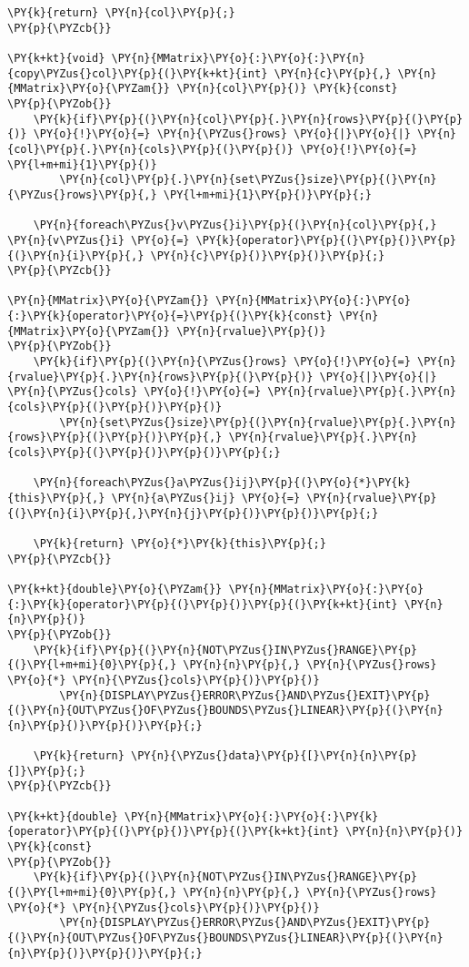 \begin{Verbatim}[commandchars=\\\{\}]
	\PY{k}{return} \PY{n}{col}\PY{p}{;}
\PY{p}{\PYZcb{}}

\PY{k+kt}{void} \PY{n}{MMatrix}\PY{o}{:}\PY{o}{:}\PY{n}{copy\PYZus{}col}\PY{p}{(}\PY{k+kt}{int} \PY{n}{c}\PY{p}{,} \PY{n}{MMatrix}\PY{o}{\PYZam{}} \PY{n}{col}\PY{p}{)} \PY{k}{const}
\PY{p}{\PYZob{}}
	\PY{k}{if}\PY{p}{(}\PY{n}{col}\PY{p}{.}\PY{n}{rows}\PY{p}{(}\PY{p}{)} \PY{o}{!}\PY{o}{=} \PY{n}{\PYZus{}rows} \PY{o}{|}\PY{o}{|} \PY{n}{col}\PY{p}{.}\PY{n}{cols}\PY{p}{(}\PY{p}{)} \PY{o}{!}\PY{o}{=} \PY{l+m+mi}{1}\PY{p}{)}
		\PY{n}{col}\PY{p}{.}\PY{n}{set\PYZus{}size}\PY{p}{(}\PY{n}{\PYZus{}rows}\PY{p}{,} \PY{l+m+mi}{1}\PY{p}{)}\PY{p}{;}

	\PY{n}{foreach\PYZus{}v\PYZus{}i}\PY{p}{(}\PY{n}{col}\PY{p}{,} \PY{n}{v\PYZus{}i} \PY{o}{=} \PY{k}{operator}\PY{p}{(}\PY{p}{)}\PY{p}{(}\PY{n}{i}\PY{p}{,} \PY{n}{c}\PY{p}{)}\PY{p}{)}\PY{p}{;}
\PY{p}{\PYZcb{}}

\PY{n}{MMatrix}\PY{o}{\PYZam{}} \PY{n}{MMatrix}\PY{o}{:}\PY{o}{:}\PY{k}{operator}\PY{o}{=}\PY{p}{(}\PY{k}{const} \PY{n}{MMatrix}\PY{o}{\PYZam{}} \PY{n}{rvalue}\PY{p}{)}
\PY{p}{\PYZob{}}
	\PY{k}{if}\PY{p}{(}\PY{n}{\PYZus{}rows} \PY{o}{!}\PY{o}{=} \PY{n}{rvalue}\PY{p}{.}\PY{n}{rows}\PY{p}{(}\PY{p}{)} \PY{o}{|}\PY{o}{|} \PY{n}{\PYZus{}cols} \PY{o}{!}\PY{o}{=} \PY{n}{rvalue}\PY{p}{.}\PY{n}{cols}\PY{p}{(}\PY{p}{)}\PY{p}{)}
		\PY{n}{set\PYZus{}size}\PY{p}{(}\PY{n}{rvalue}\PY{p}{.}\PY{n}{rows}\PY{p}{(}\PY{p}{)}\PY{p}{,} \PY{n}{rvalue}\PY{p}{.}\PY{n}{cols}\PY{p}{(}\PY{p}{)}\PY{p}{)}\PY{p}{;}

	\PY{n}{foreach\PYZus{}a\PYZus{}ij}\PY{p}{(}\PY{o}{*}\PY{k}{this}\PY{p}{,} \PY{n}{a\PYZus{}ij} \PY{o}{=} \PY{n}{rvalue}\PY{p}{(}\PY{n}{i}\PY{p}{,}\PY{n}{j}\PY{p}{)}\PY{p}{)}\PY{p}{;}

	\PY{k}{return} \PY{o}{*}\PY{k}{this}\PY{p}{;}
\PY{p}{\PYZcb{}}

\PY{k+kt}{double}\PY{o}{\PYZam{}} \PY{n}{MMatrix}\PY{o}{:}\PY{o}{:}\PY{k}{operator}\PY{p}{(}\PY{p}{)}\PY{p}{(}\PY{k+kt}{int} \PY{n}{n}\PY{p}{)}
\PY{p}{\PYZob{}}
	\PY{k}{if}\PY{p}{(}\PY{n}{NOT\PYZus{}IN\PYZus{}RANGE}\PY{p}{(}\PY{l+m+mi}{0}\PY{p}{,} \PY{n}{n}\PY{p}{,} \PY{n}{\PYZus{}rows} \PY{o}{*} \PY{n}{\PYZus{}cols}\PY{p}{)}\PY{p}{)}
		\PY{n}{DISPLAY\PYZus{}ERROR\PYZus{}AND\PYZus{}EXIT}\PY{p}{(}\PY{n}{OUT\PYZus{}OF\PYZus{}BOUNDS\PYZus{}LINEAR}\PY{p}{(}\PY{n}{n}\PY{p}{)}\PY{p}{)}\PY{p}{;}

	\PY{k}{return} \PY{n}{\PYZus{}data}\PY{p}{[}\PY{n}{n}\PY{p}{]}\PY{p}{;}
\PY{p}{\PYZcb{}}

\PY{k+kt}{double} \PY{n}{MMatrix}\PY{o}{:}\PY{o}{:}\PY{k}{operator}\PY{p}{(}\PY{p}{)}\PY{p}{(}\PY{k+kt}{int} \PY{n}{n}\PY{p}{)} \PY{k}{const}
\PY{p}{\PYZob{}}
	\PY{k}{if}\PY{p}{(}\PY{n}{NOT\PYZus{}IN\PYZus{}RANGE}\PY{p}{(}\PY{l+m+mi}{0}\PY{p}{,} \PY{n}{n}\PY{p}{,} \PY{n}{\PYZus{}rows} \PY{o}{*} \PY{n}{\PYZus{}cols}\PY{p}{)}\PY{p}{)}
		\PY{n}{DISPLAY\PYZus{}ERROR\PYZus{}AND\PYZus{}EXIT}\PY{p}{(}\PY{n}{OUT\PYZus{}OF\PYZus{}BOUNDS\PYZus{}LINEAR}\PY{p}{(}\PY{n}{n}\PY{p}{)}\PY{p}{)}\PY{p}{;}


\end{Verbatim}
